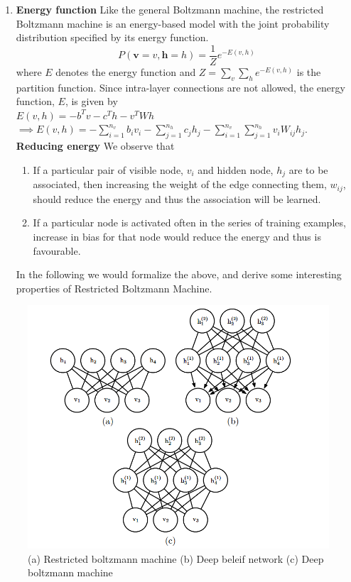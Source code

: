 \documentclass[letterpaper,10pt,english]{article}
\begin{document}
\begin{enumerate}
	\item \textbf{Energy function} Like the general Boltzmann machine, the restricted Boltzmann machine is an energy-based model with the joint probability distribution specified by its energy function.
	$$P(\textbf{v}={v},\textbf{h}=h)=\frac{1}{Z}e^{-E(v,h)}$$ where $E$ denotes the energy function and $Z=\sum_v \sum_h e^{-E(v,h)}$ is the partition function. Since intra-layer connections are not allowed, the energy function, $E$, is given by\\
	$E(v,h)=-b^Tv-c^Th-v^TWh$\\
	$\implies E(v,h)=-\sum_{i=1}^{n_v}b_iv_i-\sum_{j=1}^{n_h}c_jh_j-\sum_{i=1}^{n_v}\sum_{j=1}^{n_h}v_iW_{ij}h_j$.\\
	
	\textbf{Reducing energy} We observe that
	\begin{enumerate}
		\item If a particular pair of visible node, $v_{i}$ and hidden node, $h_{j}$ are to be associated, then increasing the weight of the edge connecting them, $w_{ij}$, should reduce the energy and thus the association will be learned.
		\item If a particular node is activated often in the series of training examples, increase in bias for that node would reduce the energy and thus is favourable.
	\end{enumerate}
	In the following we would formalize the above, and derive some interesting properties of Restricted Boltzmann Machine.
	
	
\end{enumerate}







\begin{figure}
	\centering
	\includegraphics[scale = 0.4]{machines.png}
	\caption{(a) Restricted boltzmann machine (b) Deep beleif network (c) Deep boltzmann machine}
\end{figure}
\end{document}
